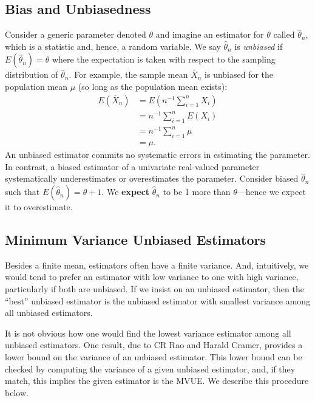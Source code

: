 \documentclass[
]{book}
\begin{document}
\hypertarget{bias-and-unbiasedness}{%
\subsection{Bias and Unbiasedness}\label{bias-and-unbiasedness}}

Consider a generic parameter denoted \(\theta\) and imagine an estimator for \(\theta\) called \(\hat\theta_n\), which is a statistic and, hence, a random variable. We say \(\hat\theta_n\) is \emph{unbiased} if \(E(\hat\theta_n)=\theta\) where the expectation is taken with respect to the sampling distribution of \(\hat\theta_n\). For example, the sample mean \(\overline X_n\) is unbiased for the population mean \(\mu\) (so long as the population mean exists):
\begin{align*}
E(\overline X_n) &= E\left(n^{-1}\sum_{i=1}^n X_i\right)\\
& = n^{-1}\sum_{i=1}^n E(X_i)\\
& = n^{-1}\sum_{i=1}^n \mu\\
& = \mu.
\end{align*}
An unbiased estimator commits no systematic errors in estimating the parameter. In contrast, a biased estimator of a univariate real-valued parameter systematically underestimates or overestimates the parameter. Consider biased \(\hat\theta_n\) such that \(E(\hat\theta_n) = \theta + 1\). We \textbf{expect} \(\hat\theta_n\) to be 1 more than \(\theta\)---hence we expect it to overestimate.

\hypertarget{minimum-variance-unbiased-estimators}{%
\subsection{Minimum Variance Unbiased Estimators}\label{minimum-variance-unbiased-estimators}}

Besides a finite mean, estimators often have a finite variance. And, intuitively, we would tend to prefer an estimator with low variance to one with high variance, particularly if both are unbiased. If we insist on an unbiased estimator, then the ``best'' unbiased estimator is the unbiased estimator with smallest variance among all unbiased estimators.

It is not obvious how one would find the lowest variance estimator among all unbiased estimators. One result, due to CR Rao and Harald Cramer, provides a lower bound on the variance of an unbiased estimator. This lower bound can be checked by computing the variance of a given unbiased estimator, and, if they match, this implies the given estimator is the MVUE. We describe this procedure below.
\end{document}
